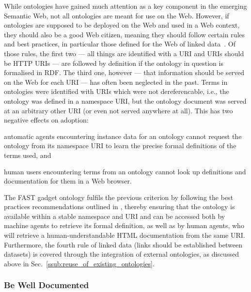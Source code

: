 \documentclass[twoside]{fast_latex}
\begin{document}
While ontologies have gained much attention as a key component in the emerging Semantic Web, not all ontologies are meant for use on the Web. However, if ontologies are supposed to be deployed on the Web and used in a Web context, they should also be a good Web citizen, meaning they should follow certain rules and best practices, in particular those defined for the Web of linked data~\cite{bernersLee2006linkedData}. Of those rules, the first two --- all things are identified with a URI and URIs should be HTTP URIs --- are followed by definition if the ontology in question is formalised in RDF. The third one, however --- that information should be served on the Web for each URI --- has often been neglected in the past. Terms in ontologies were identified with URIs which were not dereferencable, i.e., the ontology was defined in a namespace URI, but the ontology document was served at an arbitrary other URI (or even not served anywhere at all). This has two negative effects on adoption:
\begin{inparaenum}[(i)]
	\item automatic agents encountering instance data for an ontology cannot request the ontology from its namespace URI to learn the precise formal definitions of the terms used, and
	\item human users encountering terms from an ontology cannot look up definitions and documentation for them in a Web browser. 
\end{inparaenum}

The FAST gadget ontology fulfils the previous criterion by following the best practices recommendations outlined in \cite{berrueta2008publishing_rdf_vocabularies}, thereby ensuring that the ontology is available within a stable namespace and URI and can be accessed both by machine agents to retrieve its formal definition, as well as by human agents, who will retrieve a human-understandable HTML documentation from the same URI. Furthermore, the fourth rule of linked data (links should be established between datasets) is covered through the integration of external ontologies, as discussed above in Sec.~\ref{ssub:reuse_of_existing_ontologies}.


\subsubsection{Be Well Documented} %
\label{ssub:be_well_documented}
\end{document}
